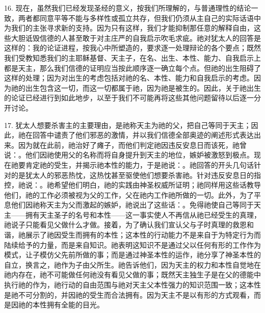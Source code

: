 16. 现在，虽然我们已经发现圣经的意义，按我们所理解的，与普通理性的结论一致，两者都同意平等不能与多样性或孤立共存，但我们仍须从主自己的实际话语中为我们的主张寻求新的支持。因为只有这样，我们才能抑制那任意的解释自由，这些大胆诋毁信德的人甚至敢于对主庄严的自我启示吹毛求疵。祂对犹太人的回答是这样的：我的论证进程，按我心中所塑造的，要求逐一处理辩论的各个要点；既然我们受教知悉我们的主耶稣基督、天主子，在名、出生、本性、能力、自我启示上都是天主，那么我们信德的证明应当按此顺序逐一确立每个点。但祂的出生阻碍了这样的处理；因为对出生的考虑包括对祂的名、本性、能力和自我启示的考虑。因为祂的出生包含这一切，而这一切都属于祂，因为祂是被生的。因此，关于祂出生的论证已经进行到如此地步，以至于我们不可能再将这些其他问题留待以后逐一分开讨论。\par

17. 犹太人想要杀害主的主要理由，是祂称天主为祂的父，把自己等同于天主；因此，祂在回答中谴责了他们邪恶的激情，并以我们信德全部奥迹的阐述形式表达出来。因为就在此前，祂治好了瘫子，而他们判定祂因违反安息日而该死，祂曾说：。他们因祂使用父的名称而将自身提升到天主的地位，嫉妒被激怒到极点。现在祂要肯定祂的受生，并揭示祂本性的能力，于是祂说：。祂回答的开头几句话针对的是犹太人的邪恶热忱，这热忱甚至驱使他们想要杀害祂。针对违反安息日的指控，祂说：。祂希望他们明白，祂的实践由神圣权威所证明；祂同样用这些话教导他们，祂的工作必须被视为父的工作，父在祂内工作祂所做的一切。此外，为了平息他们因祂称天主为父而激起的嫉妒，祂说出了这些话：。免得祂使自己等同于天主——拥有天主圣子的名号和本性——这一事实使人不再信从祂已经受生的真理，祂说子只能看见父做什么才做。接着，为了确认我们宣认父与子时真理的救恩和谐，祂展示了祂因受生而拥有的本性；这本性的行动能力不是来自于为特定行为而陆续给予的力量，而是来自知识。祂表明这知识不是通过父以任何有形的工作作为模式，让子模仿父先前所做的事；而是通过神圣本性的运作，祂分享了神圣本性的自立，换言之，祂作为子由父所生。祂告诉他们，因为天主的权力和本性自觉地在祂内存在，祂不可能做任何祂没有看见父做的事；既然天主独生子是在父的德能中执行祂的作为，祂行动的自由范围与祂对天主父本性强力的知识范围一致；这本性是祂不可分割的，并因祂的受生而合法拥有。因为天主不是以有形的方式观看，而是因祂的本性拥有全能的目光。\par


